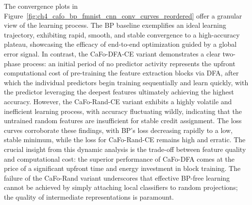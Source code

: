The convergence plots in Figure~\ref{fig:ch4_cafo_bp_fmnist_cnn_conv_curves_reordered} offer a granular view of the learning process. The BP baseline exemplifies an ideal learning trajectory, exhibiting rapid, smooth, and stable convergence to a high-accuracy plateau, showcasing the efficacy of end-to-end optimization guided by a global error signal. In contrast, the CaFo-DFA-CE variant demonstrates a clear two-phase process: an initial period of no predictor activity represents the upfront computational cost of pre-training the feature extraction blocks via DFA, after which the individual predictors begin training sequentially and learn quickly, with the predictor leveraging the deepest features ultimately achieving the highest accuracy. However, the CaFo-Rand-CE variant exhibits a highly volatile and inefficient learning process, with accuracy fluctuating wildly, indicating that the untrained random features are insufficient for stable credit assignment. The loss curves corroborate these findings, with BP’s loss decreasing rapidly to a low, stable minimum, while the loss for CaFo-Rand-CE remains high and erratic. The crucial insight from this dynamic analysis is the trade-off between feature quality and computational cost: the superior performance of CaFo-DFA comes at the price of a significant upfront time and energy investment in block training. The failure of the CaFo-Rand variant underscores that effective BP-free learning cannot be achieved by simply attaching local classifiers to random projections; the quality of intermediate representations is paramount.

